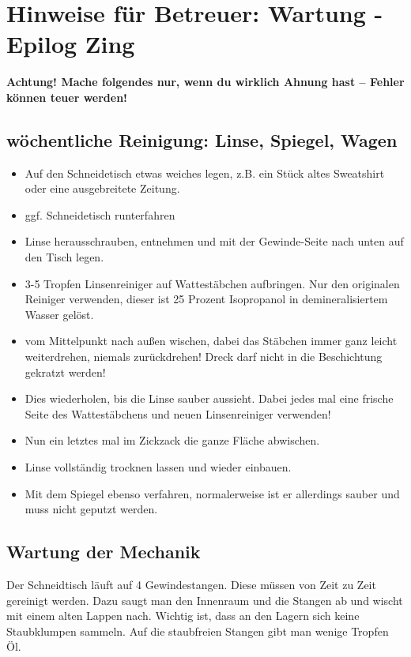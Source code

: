 \documentclass{\basedir/fablab-document}
\begin{document}
	
	\newpage
	\section{Hinweise für Betreuer: Wartung - Epilog Zing}
	
	\textbf{Achtung! Mache folgendes nur, wenn du wirklich Ahnung hast -- Fehler können teuer werden!}
	
	\subsection{wöchentliche Reinigung: Linse, Spiegel, Wagen}
	\begin{itemize}
		\label{linsenreinigung}
		\item Auf den Schneidetisch etwas weiches legen, z.B. ein Stück altes Sweatshirt oder eine ausgebreitete Zeitung.
		\item ggf. Schneidetisch runterfahren
		\item Linse herausschrauben, entnehmen und mit der Gewinde-Seite nach unten auf den Tisch legen.
		\item 3-5 Tropfen Linsenreiniger auf Wattestäbchen aufbringen. Nur den originalen Reiniger verwenden, dieser ist 25 Prozent Isopropanol in demineralisiertem Wasser gelöst.
		\item vom Mittelpunkt nach außen wischen, dabei das Stäbchen immer ganz leicht weiterdrehen, niemals zurückdrehen! Dreck darf nicht in die Beschichtung gekratzt werden!
		\item Dies wiederholen, bis die Linse sauber aussieht. Dabei jedes mal eine frische Seite des Wattestäbchens und neuen Linsenreiniger verwenden!
		\item Nun ein letztes mal im Zickzack die ganze Fläche abwischen.
		\item Linse vollständig trocknen lassen und wieder einbauen.
		\item Mit dem Spiegel ebenso verfahren, normalerweise ist er allerdings sauber und muss nicht geputzt werden.
	\end{itemize}
	
	\subsection{Wartung der Mechanik}
	Der Schneidtisch läuft auf 4 Gewindestangen. Diese müssen von Zeit zu Zeit gereinigt werden. Dazu saugt man den Innenraum und die Stangen ab und wischt mit einem alten Lappen nach. Wichtig ist, dass an den Lagern sich keine Staubklumpen sammeln. Auf die staubfreien Stangen gibt man wenige Tropfen Öl.
\end{document}
